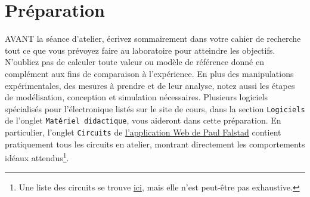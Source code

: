 \documentclass[canadien,12pt,oneside,letterpaper]{article}
\begin{document}


\section{Préparation}\label{sec:prep}

AVANT la séance d'atelier, écrivez sommairement dans votre cahier de recherche tout ce que vous prévoyez faire au laboratoire pour atteindre les objectifs. N'oubliez pas de calculer toute valeur ou modèle de référence donné en complément aux fins de comparaison à l'expérience. En plus des manipulations expérimentales, des mesures à prendre et de leur analyse, notez aussi les étapes de modélisation, conception et simulation nécessaires. Plusieurs logiciels spécialisés pour l'électronique listés sur le site de cours, dans la section \texttt{Logiciels} de l'onglet \texttt{Matériel didactique}, vous aideront dans cette préparation. En particulier, l'onglet \texttt{Circuits} de \href{https://www.falstad.com/circuit/}{l'application Web de Paul Falstad} contient pratiquement tous les circuits en atelier, montrant directement les comportements idéaux attendus\footnote{Une liste des circuits se trouve \href{https://www.falstad.com/circuit/directions.html}{ici}, mais elle n'est peut-être pas exhaustive.}. 
\end{document}
